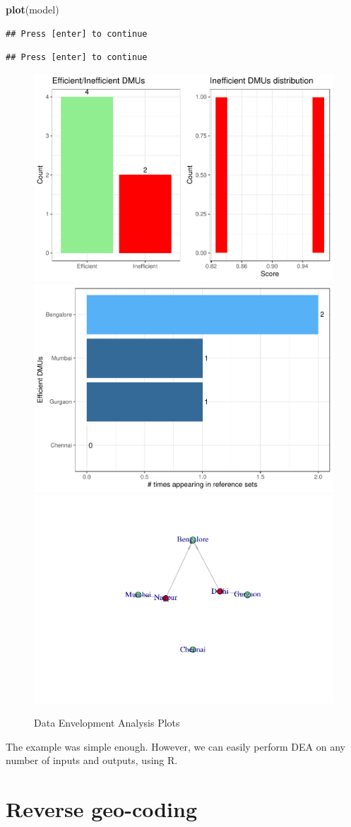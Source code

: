 \documentclass[
]{book}
\newenvironment{Shaded}{\begin{snugshade}}{\end{snugshade}}
\newcommand{\FunctionTok}[1]{\textcolor[rgb]{0.13,0.29,0.53}{\textbf{#1}}}
\newcommand{\NormalTok}[1]{#1}
\begin{document}
\begin{Shaded}
\begin{Highlighting}[]
\FunctionTok{plot}\NormalTok{(model)}
\end{Highlighting}
\end{Shaded}

\begin{verbatim}
## Press [enter] to continue
\end{verbatim}

\begin{verbatim}
## Press [enter] to continue
\end{verbatim}

\begin{figure}

{\centering \includegraphics[width=0.3\linewidth]{DauR_files/figure-latex/deaplots-1} \includegraphics[width=0.3\linewidth]{DauR_files/figure-latex/deaplots-2} \includegraphics[width=0.3\linewidth]{DauR_files/figure-latex/deaplots-3} 

}

\caption{Data Envelopment Analysis Plots}\label{fig:deaplots}
\end{figure}

The example was simple enough. However, we can easily perform DEA on any number of inputs and outputs, using R.

\hypertarget{reverse-geo-coding}{%
\chapter{Reverse geo-coding}\label{reverse-geo-coding}}
\end{document}
